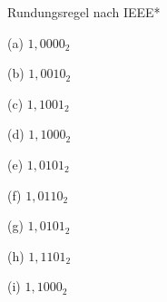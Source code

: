\begin{exercise}{Rundungsregel nach IEEE*}
\begin{solution}
\begin{center}
\begin{minipage}{0.3\textwidth}
\begin{parts}
\item[(a)] $1{,}0000_2 $
\item[(b)] $1{,}0010_2$
\item[(c)] $1{,}1001_2$
\end{parts}
\end{minipage}
\begin{minipage}{0.3\textwidth}
\begin{parts}
\item[(d)] $1{,}1000_2$
\item[(e)] $1{,}0101_2$
\item[(f)] $1{,}0110_2$
\end{parts}
\end{minipage}
\begin{minipage}{0.3\textwidth}
\begin{parts}
\item[(g)] $1{,}0101_2$
\item[(h)] $1{,}1101_2$
\item[(i)] $1{,}1000_2$
\end{parts}
\end{minipage}
\end{center}
\end{solution}
\end{exercise}
